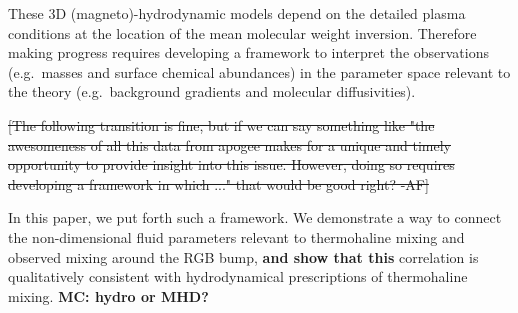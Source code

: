 These 3D (magneto)-hydrodynamic models depend on the detailed plasma conditions at the location of the mean molecular weight inversion. Therefore making progress requires developing a framework to interpret the observations (e.g.~masses and surface chemical abundances) in the parameter space relevant to the theory (e.g.~background gradients and molecular diffusivities).    

%
\sout{[The following transition is fine, but if we can say something like "the awesomeness of all this data from apogee makes for a unique and timely opportunity to provide insight into this issue. However, doing so requires developing a framework in which ..." that would be good right? -AF]}

In this paper, we put forth such a framework. 
We demonstrate a way to connect the non-dimensional fluid parameters relevant to thermohaline mixing and observed mixing around the RGB bump, \textbf{and show that this} correlation is qualitatively consistent with hydrodynamical prescriptions of thermohaline mixing. \textbf{MC: hydro or MHD?} 

